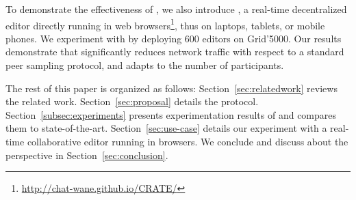 To demonstrate the effectiveness of \SPRAY, we also introduce \CRATE,
a real-time decentralized editor directly running in web
browsers\footnote{\url{http://chat-wane.github.io/CRATE/}}, thus on
  laptops, tablets, or mobile phones. We experiment with \CRATE by
deploying 600 editors on Grid'5000. Our results demonstrate that
\SPRAY significantly reduces network traffic with respect to a
standard peer sampling protocol, and adapts to the number
of participants.

The rest of this paper is organized as follows:
Section~\ref{sec:relatedwork} reviews the related
work. Section~\ref{sec:proposal} details the \SPRAY
protocol. Section~\ref{subsec:experiments} presents experimentation
results of \SPRAY and compares them to
state-of-the-art. Section~\ref{sec:use-case} details our experiment
with \CRATE a real-time collaborative editor running in browsers. We
conclude and discuss about the perspective in
Section~\ref{sec:conclusion}.

